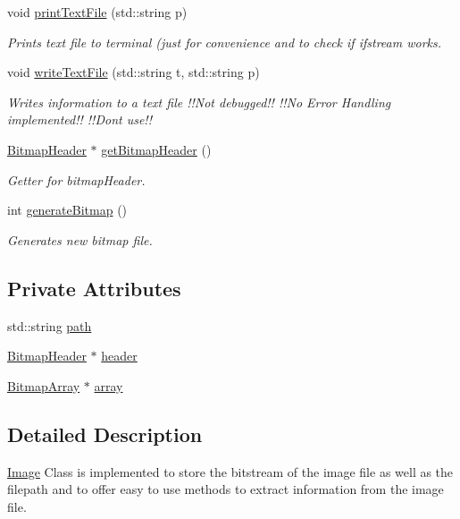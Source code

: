 \begin{DoxyCompactItemize}
void \mbox{\hyperlink{classImage_a3bde1df035fc794c268aab430bbafde0}{print\+Text\+File}} (std\+::string p)
\begin{DoxyCompactList}\small\item\em Prints text file to terminal (just for convenience and to check if ifstream works. \end{DoxyCompactList}\item 
void \mbox{\hyperlink{classImage_aa024e3ee7ec4a5e81130cc13b3570ee4}{write\+Text\+File}} (std\+::string t, std\+::string p)
\begin{DoxyCompactList}\small\item\em Writes information to a text file !!\+Not debugged!! !!\+No Error Handling implemented!! !!\+Dont use!! \end{DoxyCompactList}\item 
\mbox{\hyperlink{classBitmapHeader}{Bitmap\+Header}} $\ast$ \mbox{\hyperlink{classImage_a8c824ffac0c866a94752a2c1047932af}{get\+Bitmap\+Header}} ()
\begin{DoxyCompactList}\small\item\em Getter for bitmap\+Header. \end{DoxyCompactList}\item 
int \mbox{\hyperlink{classImage_a3ca1ae6c1eb2846bfba066b01e6020e1}{generate\+Bitmap}} ()
\begin{DoxyCompactList}\small\item\em Generates new bitmap file. \end{DoxyCompactList}\end{DoxyCompactItemize}
\subsection*{Private Attributes}
\begin{DoxyCompactItemize}
\item 
std\+::string \mbox{\hyperlink{classImage_aec8a33f176362d146da8c058798ebbff}{path}}
\item 
\mbox{\hyperlink{classBitmapHeader}{Bitmap\+Header}} $\ast$ \mbox{\hyperlink{classImage_adaf72c2df8979eafb4031dc0384dc49f}{header}}
\item 
\mbox{\hyperlink{classBitmapArray}{Bitmap\+Array}} $\ast$ \mbox{\hyperlink{classImage_a1c18dd7d9eda416d44e7eb408d5b3c38}{array}}
\end{DoxyCompactItemize}


\subsection{Detailed Description}
\mbox{\hyperlink{classImage}{Image}} Class is implemented to store the bitstream of the image file as well as the filepath and to offer easy to use methods to extract information from the image file. 

